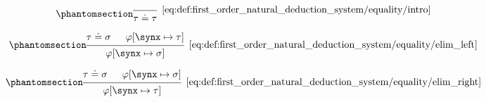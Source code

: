 \begin{definition}
\begin{thmenum}
    \begin{minipage}{0.3\textwidth}
      \begin{equation*}\taglabel[\ensuremath{ \syneq_+ }]{eq:def:first_order_natural_deduction_system/equality/intro}
        \begin{prooftree}
          \infer0[\ref{eq:def:first_order_natural_deduction_system/equality/intro}]{ \tau \syneq \tau }
        \end{prooftree}
      \end{equation*}
    \end{minipage}
    \hfill
    \begin{minipage}{0.3\textwidth}
      \begin{equation*}\taglabel[\ensuremath{ \syneq_{-L} }]{eq:def:first_order_natural_deduction_system/equality/elim_left}
        \begin{prooftree}
          \hypo{ \tau \syneq \sigma }
          \hypo{ \varphi[\synx \mapsto \tau] }
          \infer2[\ref{eq:def:first_order_natural_deduction_system/equality/elim_left}]{ \varphi[\synx \mapsto \sigma] }
        \end{prooftree}
      \end{equation*}
    \end{minipage}
    \hfill
    \begin{minipage}{0.3\textwidth}
      \begin{equation*}\taglabel[\ensuremath{ \syneq_{+L} }]{eq:def:first_order_natural_deduction_system/equality/elim_right}
        \begin{prooftree}
          \hypo{ \tau \syneq \sigma }
          \hypo{ \varphi[\synx \mapsto \sigma] }
          \infer2[\ref{eq:def:first_order_natural_deduction_system/equality/elim_right}]{ \varphi[\synx \mapsto \tau] }
        \end{prooftree}
      \end{equation*}
    \end{minipage}
  \end{thmenum}
\end{definition}

